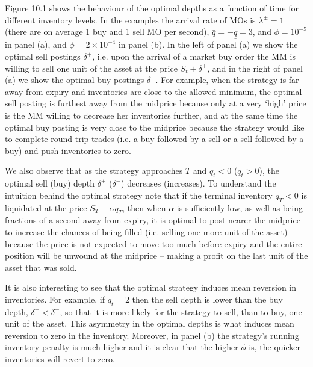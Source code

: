 \documentclass[11pt, a4paper]{book}
\begin{document}
	Figure 10.1 shows the behaviour of the optimal depths as a function of time for different inventory levels. In the examples the arrival rate of MOs is $\lambda^\pm = 1$ (there are on average 1 buy and 1 sell MO per second), $\bar{q} = -\underline{q} = 3$, and $\phi = 10^{-5}$ in panel (a), and $\phi = 2 \times 10^{-4}$ in panel (b). In the left of panel (a) we show the optimal sell postings $\delta^+$, i.e. upon the arrival of a market buy order the MM is willing to sell one unit of the asset at the price $S_t + \delta^+$, and in the right of panel (a) we show the optimal buy postings $\delta^-$. For example, when the strategy is far away from expiry and inventories are close to the allowed minimum, the optimal sell posting is furthest away from the midprice because only at a very `high' price is the MM willing to decrease her inventories further, and at the same time the optimal buy posting is very close to the midprice because the strategy would like to complete round-trip trades (i.e. a buy followed by a sell or a sell followed by a buy) and push inventories to zero.
	
	We also observe that as the strategy approaches $T$ and $q_t < 0$ ($q_t > 0$), the optimal sell (buy) depth $\delta^+$ ($\delta^-$) decreases (increases). To understand the intuition behind the optimal strategy note that if the terminal inventory $q_T < 0$ is liquidated at the price $S_T - \alpha q_T$, then when $\alpha$ is sufficiently low, as well as being fractions of a second away from expiry, it is optimal to post nearer the midprice to increase the chances of being filled (i.e. selling one more unit of the asset) because the price is not expected to move too much before expiry and the entire position will be unwound at the midprice – making a profit on the last unit of the asset that was sold.
	
	It is also interesting to see that the optimal strategy induces mean reversion in inventories. For example, if $q_t = 2$ then the sell depth is lower than the buy depth, $\delta^+ < \delta^-$, so that it is more likely for the strategy to sell, than to buy, one unit of the asset. This asymmetry in the optimal depths is what induces mean reversion to zero in the inventory. Moreover, in panel (b) the strategy's running inventory penalty is much higher and it is clear that the higher $\phi$ is, the quicker inventories will revert to zero.
	
\end{document}
